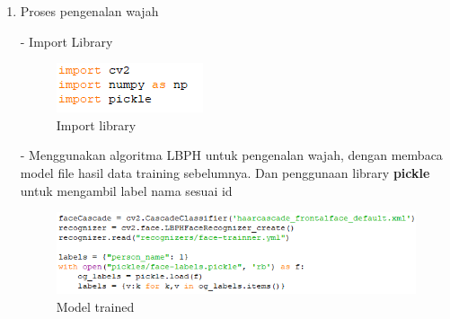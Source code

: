 \begin{enumerate}
    \item Proses pengenalan wajah
    
    - Import Library
    \begin{figure}[h!]
        \centering
        \includegraphics[width=0.4\linewidth]{images/fr_cam15.PNG}
        \caption{Import library}
    \end{figure}

    - Menggunakan algoritma LBPH untuk pengenalan wajah, dengan membaca model file hasil 
    data training sebelumnya. Dan penggunaan library \textbf{pickle} untuk mengambil label nama sesuai id
    \begin{figure}[h!]
        \centering
        \includegraphics[width=1\linewidth]{images/fr_cam16.PNG}
        \caption{Model trained}
    \end{figure}


\end{enumerate}
